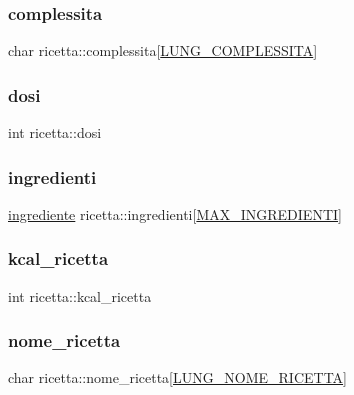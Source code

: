 \subsubsection{\texorpdfstring{complessita}{complessita}}
{\footnotesize\ttfamily char ricetta\+::complessita\mbox{[}\hyperlink{ricette_8h_afdcfe3df8eca40e79c8d2854a52acbb0}{L\+U\+N\+G\+\_\+\+C\+O\+M\+P\+L\+E\+S\+S\+I\+TA}\mbox{]}}

\mbox{\label{structricetta_abbc9584ea1555c9642adbe72ffb2f9bd}} 
\subsubsection{\texorpdfstring{dosi}{dosi}}
{\footnotesize\ttfamily int ricetta\+::dosi}

\mbox{\label{structricetta_ac8567e615af6b01c27b2aea1fc81c50f}} 
\subsubsection{\texorpdfstring{ingredienti}{ingredienti}}
{\footnotesize\ttfamily \hyperlink{structingrediente}{ingrediente} ricetta\+::ingredienti\mbox{[}\hyperlink{ricette_8h_a3f37fa2abc5ee352f9a922ef72b80116}{M\+A\+X\+\_\+\+I\+N\+G\+R\+E\+D\+I\+E\+N\+TI}\mbox{]}}

\mbox{\label{structricetta_abdd39d8054927daf2a648aef9aea1909}} 
\subsubsection{\texorpdfstring{kcal\+\_\+ricetta}{kcal\_ricetta}}
{\footnotesize\ttfamily int ricetta\+::kcal\+\_\+ricetta}

\mbox{\label{structricetta_a40bb51c26dc338c485cc655bea2c2ca5}} 
\subsubsection{\texorpdfstring{nome\+\_\+ricetta}{nome\_ricetta}}
{\footnotesize\ttfamily char ricetta\+::nome\+\_\+ricetta\mbox{[}\hyperlink{ricette_8h_aacd065596f33b6510fa58f8ba4dea542}{L\+U\+N\+G\+\_\+\+N\+O\+M\+E\+\_\+\+R\+I\+C\+E\+T\+TA}\mbox{]}}

